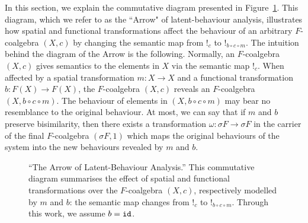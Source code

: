 In this section, we explain the commutative diagram presented in Figure~\ref{fig:TheArrow}. This diagram, which we refer to as the ``Arrow" of latent-behaviour analysis, illustrates how spatial and functional transformations affect the behaviour of an arbitrary $F$-coalgebra $(X,c)$ by changing the semantic map from $!_c$ to $!_{b\circ c\circ m}$. The intuition behind the diagram of the Arrow is the following. Normally, an $F$-coalgebra $(X,c)$ gives semantics to the elements in $X$ via the semantic map $!_c$. When affected by a spatial transformation $m\colon X\rightarrow X$ and a functional transformation $b\colon F(X)\rightarrow F(X)$, the $F$-coalgebra $(X,c)$ reveals an $F$-coalgebra $(X,b\circ c\circ m)$. The behaviour of elements in $(X,b\circ c\circ m)$ may bear no resemblance to the original behaviour. At most, we can say that if $m$ and $b$ preserve bisimilarity, then there exists a transformation $\omega\colon \sigma F \rightarrow \sigma F$ in the carrier of the final $F$-coalgebra $(\sigma F, 1)$ which maps the original behaviours of the system into the new behaviours revealed by $m$ and $b$. 

\begin{figure}[h]
        \centering
        \caption{``The Arrow of Latent-Behaviour Analysis.'' This commutative diagram summarises the effect of spatial and functional transformations over the $F$-coalgebra $(X,c)$, respectively modelled by $m$ and $b$: the semantic map changes from $!_c$ to $!_{b\circ c\circ m}$. Through this work, we assume $b={\texttt{id}}$.}
        \label{fig:TheArrow} 
    \end{figure}

